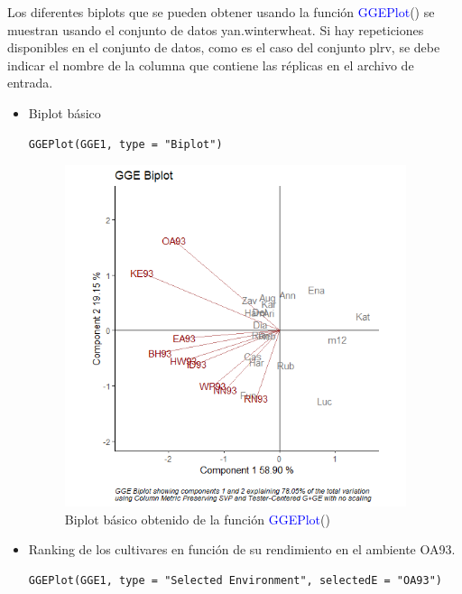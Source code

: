 Los diferentes biplots que se pueden obtener usando la función \textcolor{blue}{GGEPlot}() se muestran usando el conjunto de datos yan.winterwheat. Si hay repeticiones disponibles en el conjunto de datos, como es el caso del conjunto plrv, se debe indicar el nombre de la columna que contiene las réplicas en el archivo de entrada.


\begin{itemize}
\item Biplot básico

\begin{lstlisting}
GGEPlot(GGE1, type = "Biplot")
\end{lstlisting}

\begin{figure}[H]
	\begin{center}
		\includegraphics[width=10cm]{./Graficos/GGE_BIPLOT.png}
	\end{center}
	\caption{Biplot básico obtenido de la función \textcolor{blue}{GGEPlot}()}
\end{figure}

\item Ranking de los cultivares en función de su rendimiento en el ambiente OA93.

\begin{lstlisting}
GGEPlot(GGE1, type = "Selected Environment", selectedE = "OA93")
\end{lstlisting}



\end{itemize}
